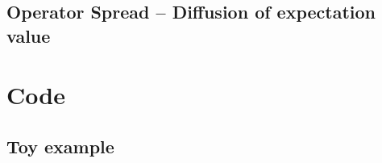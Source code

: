 \documentclass[11pt, oneside, listof=totoc]{scrbook}
\begin{document}
\section{Operator Spread -- Diffusion of expectation value}


\appendix

\chapter{Code}\label{appendix:code}

\section{Toy example}




\backmatter
\printbibliography[heading=bibintoc, title=Bibliography]
\end{document}
